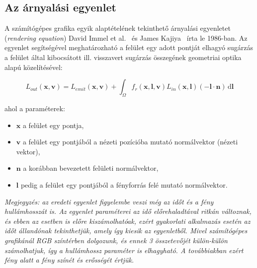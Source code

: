 \subsection{Az árnyalási egyenlet}

A számítógépes grafika egyik alaptételének tekinthető árnyalási egyenletet (\textit{rendering equation}) David Immel et al.~\cite{immel1986radiosity} és James Kajiya~\cite{kajiya1986rendering} írta le 1986-ban. Az egyenlet segítségével meghatározható a felület egy adott pontját elhagyó sugárzás a felület által kibocsátott ill. visszavert sugárzás összegének geometriai optika alapú közelítésével:

\[
L_{out}(\mathbf{x},\mathbf{v}) = L_{emit}(\mathbf{x},\mathbf{v}) + \int_\Omega f_r(\mathbf{x},\mathbf{l},\mathbf{v}) L_{in}(\mathbf{x},\mathbf{l}) (-\mathbf{l} \cdot \mathbf{n})\,\mathrm{d}\mathbf{l}
\]

\noindent
ahol a paraméterek:

\begin{itemize}[noitemsep]
\item \(\mathbf{x}\) a felület egy pontja,
\item \(\mathbf{v}\) a felület egy pontjából a nézeti pozícióba mutató normálvektor (nézeti vektor),
\item \(\mathbf{n}\) a korábban bevezetett felületi normálvektor,
\item \(\mathbf{l}\) pedig a felület egy pontjából a fényforrás felé mutató normálvektor.
\end{itemize}

\noindent
\textit{Megjegyzés: az eredeti egyenlet figyelembe veszi még az időt és a fény hullámhosszát is. Az egyenlet paraméterei az idő előrehaladtával ritkán változnak, és ebben az esetben is előre kiszámolhatóak, ezért gyakorlati alkalmazás esetén az időt állandónak tekinthetjük, amely így kiesik az egyenletből. Mivel számítógépes grafikánál RGB színtérben dolgozunk, és ennek 3 összetevőjét külön-külön számolhatjuk, így a hullámhossz paraméter is elhagyható. A továbbiakban ezért fény alatt a fény színét és erősségét értjük.}

